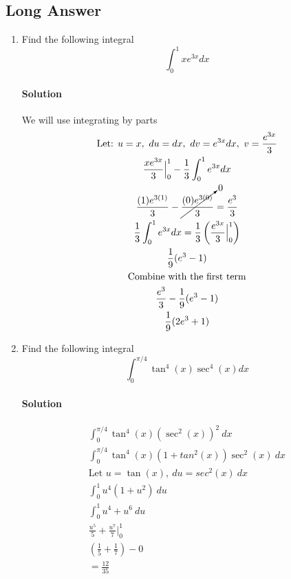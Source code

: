 \documentclass[MATH-115-Notes.tex]{subfiles}
\begin{document}
\subsection{Long Answer}
\begin{enumerate}
    \item Find the following integral \[\int_{0}^{1}xe^{3x}dx\]
    \paragraph*{Solution}
    We will use integrating by parts
    \begin{gather*}
        \text{Let: } u = x,\ du = dx,\ dv = e^{3x}dx,\ v = \frac{e^{3x}}{3}\\
        \frac{xe^{3x}}{3}\Big|_0^1 - \frac{1}{3} \int_{0}^{1} e^{3x}dx\\
        \frac{(1)e^{3(1)}}{3} - \cancelto{0}{\frac{(0)e^{3(0)}}{3}} = \frac{e^{3}}{3}\\
        \frac{1}{3} \int_{0}^{1} e^{3x}dx = \frac{1}{3} \left( \frac{e^{3x}}{3}\Big|_0^1 \right)\\
        \frac{1}{9}(e^3 - 1)\\
        \text{Combine with the first term}\\
        \frac{e^{3}}{3} - \frac{1}{9}(e^3 - 1)\\
        \frac{1}{9}(2e^3 + 1)
    \end{gather*}


    \item Find the following integral \[\int_{0}^{\pi/4}\tan^4(x)\sec^4(x)dx\]
    \paragraph*{Solution}
    \begin{gather*}
        \int_{0}^{\pi/4} \tan^4(x)(\sec^2(x))^2\ dx\\
        \int_{0}^{\pi/4} \tan^4(x) (1 + tan^2(x)) \sec^2(x)\ dx\\
        \text{Let } u = \tan(x),\ du = sec^2(x)\ dx\\
        \int_{0}^{1} u^4 (1 + u^2)\ du\\
        \int_{0}^{1} u^4 + u^6\ du\\
        \frac{u^5}{5} + \frac{u^7}{7}\Big|_0^1\\
        \left( \frac{1}{5} + \frac{1}{7}  \right) - 0\\
        = \frac{12}{35}
    \end{gather*}



\end{enumerate}
\end{document}
